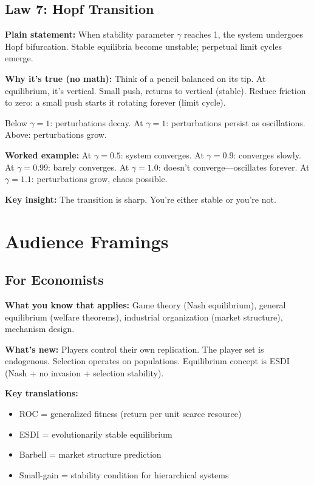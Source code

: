 \documentclass[12pt]{article}
\begin{document}
\subsection{Law 7: Hopf Transition}

\textbf{Plain statement:} When stability parameter $\gamma$ reaches 1, the system undergoes Hopf bifurcation. Stable equilibria become unstable; perpetual limit cycles emerge.

\textbf{Why it's true (no math):} Think of a pencil balanced on its tip. At equilibrium, it's vertical. Small push, returns to vertical (stable). Reduce friction to zero: a small push starts it rotating forever (limit cycle).

Below $\gamma = 1$: perturbations decay. At $\gamma = 1$: perturbations persist as oscillations. Above: perturbations grow.

\textbf{Worked example:} At $\gamma = 0.5$: system converges. At $\gamma = 0.9$: converges slowly. At $\gamma = 0.99$: barely converges. At $\gamma = 1.0$: doesn't converge---oscillates forever. At $\gamma = 1.1$: perturbations grow, chaos possible.

\textbf{Key insight:} The transition is sharp. You're either stable or you're not.


\section{Audience Framings}
\label{app:audiences}

\subsection{For Economists}

\textbf{What you know that applies:} Game theory (Nash equilibrium), general equilibrium (welfare theorems), industrial organization (market structure), mechanism design.

\textbf{What's new:} Players control their own replication. The player set is endogenous. Selection operates on populations. Equilibrium concept is ESDI (Nash + no invasion + selection stability).

\textbf{Key translations:}
\begin{itemize}[nosep]
\item ROC = generalized fitness (return per unit scarce resource)
\item ESDI = evolutionarily stable equilibrium
\item Barbell = market structure prediction
\item Small-gain = stability condition for hierarchical systems
\end{itemize}
\end{document}
